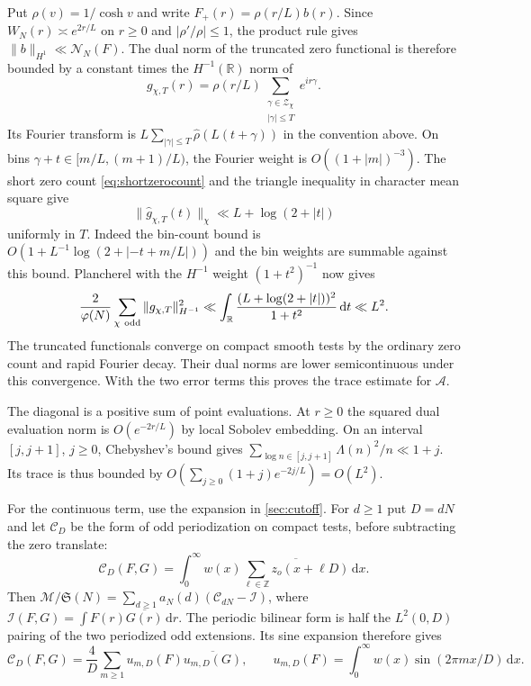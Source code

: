 \documentclass[11pt,a4paper]{article}
\numberwithin{equation}{section}
\newcommand{\SSS}{\mathfrak S}
\newcommand{\ud}{\mathrm d}
\newcommand{\NN}{\mathcal N_N}
\begin{document}
Put $\rho(v)=1/\cosh v$ and write $F_+(r)=\rho(r/L)b(r)$.
Since $W_N(r)\asymp e^{2r/L}$ on $r\ge0$ and
$|\rho'/\rho|\le1$, the product rule gives
$\|b\|_{H^1}\ll\NN(F)$. The dual norm of the truncated
zero functional is therefore bounded by a constant
times the $H^{-1}(\mathbb R)$ norm of
\[
 g_{\chi,T}(r)=\rho(r/L)
       \sum_{\substack{\gamma\in\mathcal Z_\chi\\|\gamma|\le T}}
             e^{ir\gamma}.
\]
Its Fourier transform is
$L\sum_{|\gamma|\le T}\widehat\rho(L(t+\gamma))$ in the
convention above. On bins
$\gamma+t\in[m/L,(m+1)/L)$, the Fourier weight is
$O((1+|m|)^{-3})$. The short zero count
\cref{eq:shortzerocount} and the triangle inequality in
character mean square give
\[
 \|\widehat g_{\chi,T}(t)\|_\chi\ll L+\log(2+|t|)
\]
uniformly in $T$. Indeed the bin-count bound is
$O(1+L^{-1}\log(2+|-t+m/L|))$ and the bin weights
are summable against this bound. Plancherel with the
$H^{-1}$ weight $(1+t^2)^{-1}$ now gives
\[
 \frac2{\varphi(N)}\sum_{\chi\ {\rm odd}}
         \|g_{\chi,T}\|_{H^{-1}}^2
  \ll \int_{\mathbb R}\frac{(L+\log(2+|t|))^2}{1+t^2}\,\ud t
  \ll L^2.
\]
The truncated functionals converge on compact smooth
tests by the ordinary zero count and rapid Fourier
decay. Their dual norms are lower semicontinuous under
this convergence. With the two error terms this proves
the trace estimate for $\mathcal A$.

The diagonal is a positive sum of point evaluations.
At $r\ge0$ the squared dual evaluation norm is
$O(e^{-2r/L})$ by local Sobolev embedding. On an interval
$[j,j+1]$, $j\ge0$, Chebyshev's bound gives
$\sum_{\log n\in[j,j+1]}\Lambda(n)^2/n\ll 1+j$.
Its trace is thus bounded by
$O(\sum_{j\ge0}(1+j)e^{-2j/L})=O(L^2)$.

For the continuous term, use the expansion in
\cref{sec:cutoff}. For $d\ge1$ put $D=dN$ and let
$\mathcal C_D$ be the form of odd periodization on compact
tests, before subtracting the zero translate:
\[
 \mathcal C_D(F,G)=
   \int_0^\infty w(x)\overline{\sum_{\ell\in\mathbb Z}
                                 z_o(x+\ell D)}\,\ud x .
\]
Then $\mathcal M/\SSS(N)=\sum_{d\ge1}a_N(d)
(\mathcal C_{dN}-\mathcal I)$, where
$\mathcal I(F,G)=\int F(r)\overline{G(r)}\,\ud r$.
The periodic bilinear form is half the $L^2(0,D)$ pairing
of the two periodized odd extensions. Its sine expansion
therefore gives
\begin{equation}
 \mathcal C_D(F,G)=\frac4D\sum_{m\ge1} u_{m,D}(F)
                                  \overline{u_{m,D}(G)},
 \qquad
 u_{m,D}(F)=\int_0^\infty w(x)\sin(2\pi mx/D)\,\ud x .
 \label{eq:periodtr}
\end{equation}
\end{document}
